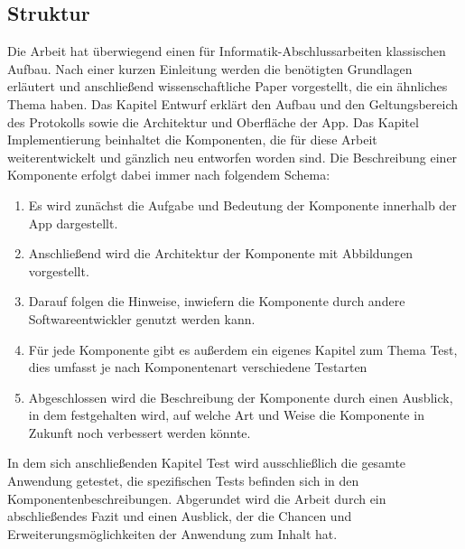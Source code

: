 \subsection{Struktur}
Die Arbeit hat überwiegend einen für Informatik-Abschlussarbeiten klassischen Aufbau. Nach einer kurzen Einleitung werden die benötigten Grundlagen erläutert und anschließend wissenschaftliche Paper vorgestellt, die ein ähnliches Thema haben. Das Kapitel Entwurf erklärt den Aufbau und den Geltungsbereich des Protokolls sowie die Architektur und Oberfläche der App. Das Kapitel Implementierung beinhaltet die Komponenten, die für diese Arbeit weiterentwickelt und gänzlich neu entworfen worden sind. Die Beschreibung einer Komponente erfolgt dabei immer nach folgendem Schema:
\begin{enumerate}
	\item Es wird zunächst die Aufgabe und Bedeutung der Komponente innerhalb der App dargestellt.
	\item Anschließend wird die Architektur der Komponente mit Abbildungen vorgestellt.
	\item Darauf folgen die Hinweise, inwiefern die Komponente durch andere Softwareentwickler genutzt werden kann.
	\item Für jede Komponente gibt es außerdem ein eigenes Kapitel zum Thema Test, dies umfasst je nach Komponentenart verschiedene Testarten
	\item Abgeschlossen wird die Beschreibung der Komponente durch einen Ausblick, in dem festgehalten wird, auf welche Art und Weise die Komponente in Zukunft noch verbessert werden könnte.
\end{enumerate}
In dem sich anschließenden Kapitel Test wird ausschließlich die gesamte Anwendung getestet, die spezifischen Tests befinden sich in den Komponentenbeschreibungen. 
\newline Abgerundet wird die Arbeit durch ein abschließendes Fazit und einen Ausblick, der die Chancen und Erweiterungsmöglichkeiten der Anwendung zum Inhalt hat.
\newpage


